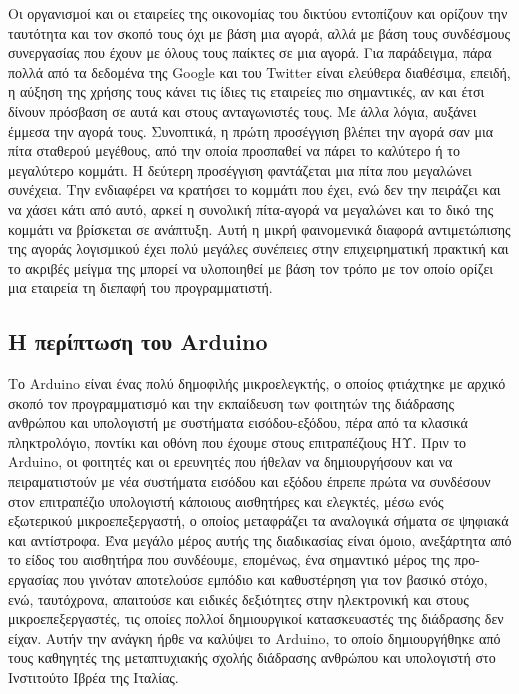 \documentclass[
]{article}
\begin{document}
Οι οργανισμοί και οι εταιρείες της οικονομίας του δικτύου εντοπίζουν και
ορίζουν την ταυτότητα και τον σκοπό τους όχι με βάση μια αγορά, αλλά με
βάση τους συνδέσμους συνεργασίας που έχουν με όλους τους παίκτες σε μια
αγορά. Για παράδειγμα, πάρα πολλά από τα δεδομένα της Google και του
Twitter είναι ελεύθερα διαθέσιμα, επειδή, η αύξηση της χρήσης τους κάνει
τις ίδιες τις εταιρείες πιο σημαντικές, αν και έτσι δίνουν πρόσβαση σε
αυτά και στους ανταγωνιστές τους. Με άλλα λόγια, αυξάνει έμμεσα την
αγορά τους. Συνοπτικά, η πρώτη προσέγγιση βλέπει την αγορά σαν μια πίτα
σταθερού μεγέθους, από την οποία προσπαθεί να πάρει το καλύτερο ή το
μεγαλύτερο κομμάτι. Η δεύτερη προσέγγιση φαντάζεται μια πίτα που
μεγαλώνει συνέχεια. Την ενδιαφέρει να κρατήσει το κομμάτι που έχει, ενώ
δεν την πειράζει και να χάσει κάτι από αυτό, αρκεί η συνολική πίτα-αγορά
να μεγαλώνει και το δικό της κομμάτι να βρίσκεται σε ανάπτυξη. Αυτή η
μικρή φαινομενικά διαφορά αντιμετώπισης της αγοράς λογισμικού έχει πολύ
μεγάλες συνέπειες στην επιχειρηματική πρακτική και το ακριβές μείγμα της
μπορεί να υλοποιηθεί με βάση τον τρόπο με τον οποίο ορίζει μια εταιρεία
τη διεπαφή του προγραμματιστή.

\hypertarget{ux3b7-ux3c0ux3b5ux3c1ux3afux3c0ux3c4ux3c9ux3c3ux3b7-ux3c4ux3bfux3c5-arduino}{%
\subsection{Η περίπτωση του
Arduino}\label{ux3b7-ux3c0ux3b5ux3c1ux3afux3c0ux3c4ux3c9ux3c3ux3b7-ux3c4ux3bfux3c5-arduino}}

Το Arduino είναι ένας πολύ δημοφιλής μικροελεγκτής, ο οποίος φτιάχτηκε
με αρχικό σκοπό τον προγραμματισμό και την εκπαίδευση των φοιτητών της
διάδρασης ανθρώπου και υπολογιστή με συστήματα εισόδου-εξόδου, πέρα από
τα κλασικά πληκτρολόγιο, ποντίκι και οθόνη που έχουμε στους
επιτραπέζιους ΗΥ. Πριν το Arduino, οι φοιτητές και οι ερευνητές που
ήθελαν να δημιουργήσουν και να πειραματιστούν με νέα συστήματα εισόδου
και εξόδου έπρεπε πρώτα να συνδέσουν στον επιτραπέζιο υπολογιστή
κάποιους αισθητήρες και ελεγκτές, μέσω ενός εξωτερικού μικροεπεξεργαστή,
ο οποίος μεταφράζει τα αναλογικά σήματα σε ψηφιακά και αντίστροφα. Ένα
μεγάλο μέρος αυτής της διαδικασίας είναι όμοιο, ανεξάρτητα από το είδος
του αισθητήρα που συνδέουμε, επομένως, ένα σημαντικό μέρος της
προ-εργασίας που γινόταν αποτελούσε εμπόδιο και καθυστέρηση για τον
βασικό στόχο, ενώ, ταυτόχρονα, απαιτούσε και ειδικές δεξιότητες στην
ηλεκτρονική και στους μικροεπεξεργαστές, τις οποίες πολλοί δημιουργικοί
κατασκευαστές της διάδρασης δεν είχαν. Αυτήν την ανάγκη ήρθε να καλύψει
το Arduino, το οποίο δημιουργήθηκε από τους καθηγητές της μεταπτυχιακής
σχολής διάδρασης ανθρώπου και υπολογιστή στο Ινστιτούτο Ιβρέα της
Ιταλίας.
\end{document}
